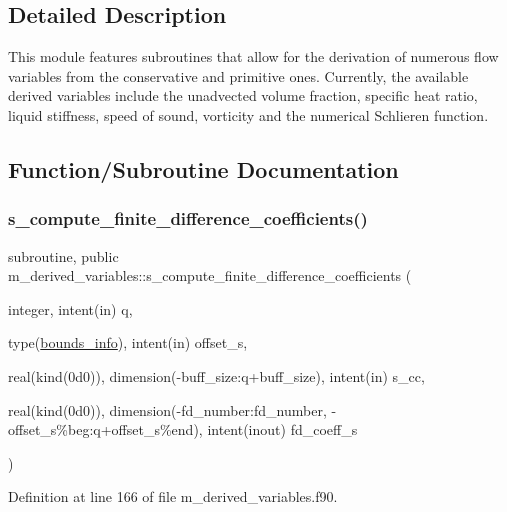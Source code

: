 \subsection{Detailed Description}
This module features subroutines that allow for the derivation of numerous flow variables from the conservative and primitive ones. Currently, the available derived variables include the unadvected volume fraction, specific heat ratio, liquid stiffness, speed of sound, vorticity and the numerical Schlieren function. 

\subsection{Function/\+Subroutine Documentation}
\mbox{\label{namespacem__derived__variables_acf313542c783139e0798f2097d1f68fc}} 
\subsubsection{\texorpdfstring{s\+\_\+compute\+\_\+finite\+\_\+difference\+\_\+coefficients()}{s\_compute\_finite\_difference\_coefficients()}}
{\footnotesize\ttfamily subroutine, public m\+\_\+derived\+\_\+variables\+::s\+\_\+compute\+\_\+finite\+\_\+difference\+\_\+coefficients (\begin{DoxyParamCaption}\item[{integer, intent(in)}]{q,  }\item[{type(\hyperlink{structm__derived__types_1_1bounds__info}{bounds\+\_\+info}), intent(in)}]{offset\+\_\+s,  }\item[{real(kind(0d0)), dimension(-\/buff\+\_\+size\+:q+buff\+\_\+size), intent(in)}]{s\+\_\+cc,  }\item[{real(kind(0d0)), dimension(-\/fd\+\_\+number\+:fd\+\_\+number, -\/offset\+\_\+s\%beg\+:q+offset\+\_\+s\%end), intent(inout)}]{fd\+\_\+coeff\+\_\+s }\end{DoxyParamCaption})}



Definition at line 166 of file m\+\_\+derived\+\_\+variables.\+f90.

